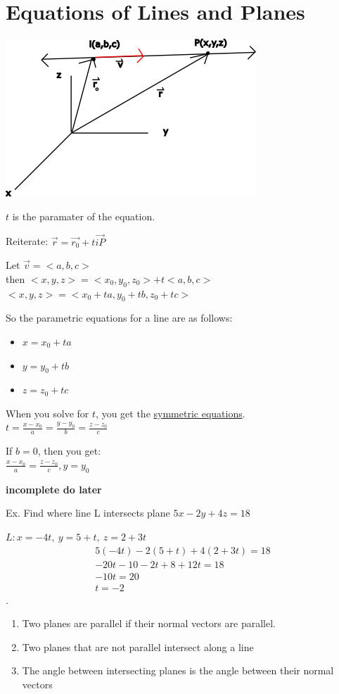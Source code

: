 \documentclass[12pt]{article}
\begin{document}
\section{Equations of Lines and Planes} 

\includegraphics{line3d}

$t$ is the paramater of the equation.

Reiterate: $\vec{r} = \vec{r_0} +t \vec{iP} $

Let $\vec{v}=<a,b,c> $\\%
then $<x,y,z>=<x_0,y_0,z_0> + t<a,b,c>$\\%
$<x,y,z>=<x_0+ta,y_0+tb, z_0+tc>$

So the parametric equations for a line are as follows:
\begin{itemize}
	\item $x=x_0+ta$
	\item $y=y_0+tb$
	\item $z=z_0+tc$
\end{itemize}

When you solve for $t$, you get the \underline{symmetric equations}.\\%
$t=\frac{x-x_0}{a}=\frac{y-y_0}{b}=\frac{z-z_0}{c}$

If $b=0$, then you get:\\%
$\frac{x-x_0}{a}=\frac{z-z_0}{c}, y=y_0$



\textbf{incomplete do later}

Ex. 
Find where line L intersects plane $5x-2y+4z=18$

$L: x= -4t,\ y=5+t,\ z=2+3t$
\begin{align}
5(-4t)-2(5+t)+4(2+3t)=18\\
-20t-10-2t+8+12t=18\\
-10t=20\\
t=-2
\end{align}.
\begin{enumerate}
	\item Two planes are parallel if their normal vectors are parallel.
	\item Two planes that are not parallel intersect along a line
	\item The angle between intersecting planes is the angle between their normal vectors 
\end{enumerate}
\end{document}
